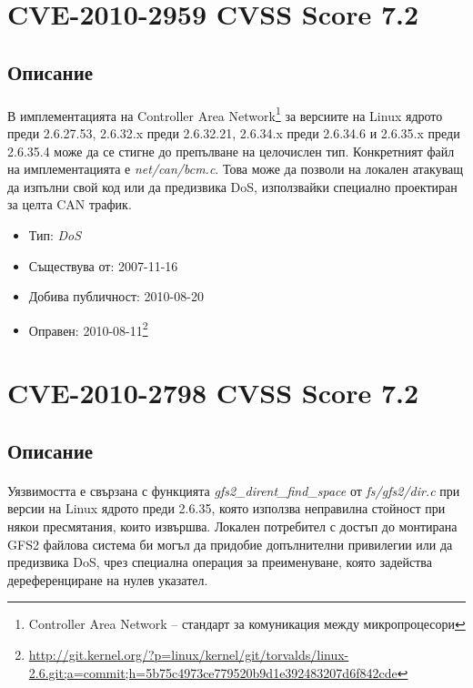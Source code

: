 \documentclass[a4paper,12pt,leqno]{article}
\begin{document}
\section{CVE-2010-2959 CVSS Score 7.2}
\subsection{Описание}
\paragraph{}
В имплементацията на Controller Area Network\footnote{Controller Area Network – стандарт за комуникация между микропроцесори}
 за версиите на Linux ядрото 
преди 2.6.27.53, 2.6.32.x преди 2.6.32.21, 2.6.34.x преди 2.6.34.6 и 2.6.35.x 
преди 2.6.35.4 може да се стигне до препълване на целочислен тип. 
Конкретният файл на имплементацията е \textit{net/can/bcm.c}. Това може да позволи 
на локален атакуващ да изпълни свой код или да предизвика DoS, 
използвайки специално проектиран за целта CAN трафик.


\begin{itemize}
    \item Тип: \textit{DoS}
    \item Съществува от: 2007-11-16
  	\item Добива публичност: 2010-08-20
    \item Оправен: 2010-08-11\footnote{\url{http://git.kernel.org/?p=linux/kernel/git/torvalds/linux-2.6.git;a=commit;h=5b75c4973ce779520b9d1e392483207d6f842cde}}
\end{itemize}

\section{CVE-2010-2798 CVSS Score 7.2}
\subsection{Описание}
\paragraph{}
Уязвимостта е свързана с функцията \textit{gfs2\_dirent\_find\_space} от \textit{fs/gfs2/dir.c} при 
версии на Linux ядрото преди 2.6.35, която използва неправилна стойност при 
някои пресмятания, които извършва. Локален потребител с достъп до монтирана GFS2 файлова система би могъл да придобие допълнителни привилегии 
или да предизвика DoS, чрез специална операция за преименуване, която 
задейства дереференциране на нулев указател.
\end{document}
